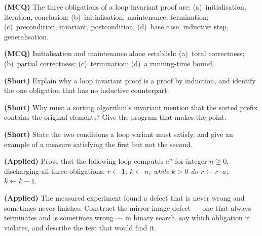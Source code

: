 \begin{reviewq}
  \item \textbf{(MCQ)} The three obligations of a loop invariant proof are:
        (a)~initialisation, iteration, conclusion; (b)~initialisation,
        maintenance, termination; (c)~precondition, invariant, postcondition;
        (d)~base case, inductive step, generalisation.
  \item \textbf{(MCQ)} Initialisation and maintenance alone establish:
        (a)~total correctness; (b)~partial correctness; (c)~termination;
        (d)~a running-time bound.
  \item \textbf{(Short)} Explain why a loop invariant proof is a proof by
        induction, and identify the one obligation that has no inductive
        counterpart.
  \item \textbf{(Short)} Why must a sorting algorithm's invariant mention that
        the sorted prefix contains the original elements? Give the program that
        makes the point.
  \item \textbf{(Short)} State the two conditions a loop variant must satisfy,
        and give an example of a measure satisfying the first but not the
        second.
  \item \textbf{(Applied)} Prove that the following loop computes $a^{n}$ for
        integer $n \ge 0$, discharging all three obligations:
        \textit{$r \gets 1$; $k \gets n$; while $k > 0$ do $r \gets r \cdot a$;
        $k \gets k - 1$}.
  \item \textbf{(Applied)} The measured experiment found a defect that is never
        wrong and sometimes never finishes. Construct the mirror-image defect
        --- one that always terminates and is sometimes wrong --- in binary
        search, say which obligation it violates, and describe the test that
        would find it.
\end{reviewq}
